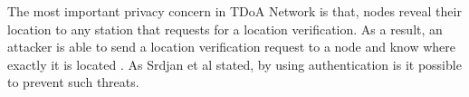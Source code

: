 The most important privacy concern in TDoA Network is that, nodes reveal their location to any station that requests for a location verification. As a result, an attacker is able to send a location verification request to a node and know where exactly it is located \cite{srivastava}. As Srdjan et al stated, by using authentication is it possible to prevent such threats.
